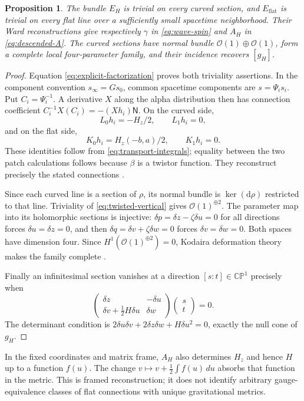 \documentclass[11pt]{article}
\numberwithin{equation}{section}
\newtheorem{proposition}[theorem]{Proposition}
\theoremstyle{definition}
\theoremstyle{remark}
\newcommand{\CP}{\mathbb{CP}}
\newcommand{\OO}{\mathcal O}
\newcommand{\dd}{\mathrm d}
\newcommand{\NN}{\mathsf N}
\begin{document}
\begin{proposition}\label{prop:reconstruction}
The bundle $E_H$ is trivial on every curved section, and $E_{\mathrm{flat}}$ is trivial on every flat line over a sufficiently small spacetime neighborhood. Their Ward reconstructions give respectively $\gamma$ in \eqref{eq:wave-spin} and $A_H$ in \eqref{eq:descended-A}. The curved sections have normal bundle $\OO(1)\oplus\OO(1)$, form a complete local four-parameter family, and their incidence recovers $[g_H]$.
\end{proposition}
\begin{proof}
Equation \eqref{eq:explicit-factorization} proves both triviality assertions. In the component convention $s_\infty=Gs_0$, common spacetime components are $s=\Psi_i s_i$. Put $C_i=\Psi_i^{-1}$. A derivative $X$ along the alpha distribution then has connection coefficient $C_i^{-1}X(C_i)=-(Xh_i)\NN$. On the curved side,
\[
L_0h_i=-H_z/2,\qquad L_1h_i=0,
\]
and on the flat side,
\[
K_0h_i=H_z(-b,a)/2,\qquad K_1h_i=0.
\]
These identities follow from \eqref{eq:transport-integrals}; equality between the two patch calculations follows because $\beta$ is a twistor function. They reconstruct precisely the stated connections \cite{Ward}.

Since each curved line is a section of $\rho$, its normal bundle is $\ker(\dd\rho)$ restricted to that line. Triviality of \eqref{eq:twisted-vertical} gives $\OO(1)^{\oplus2}$. The parameter map into its holomorphic sections is injective: $\delta p=\delta z-\zeta\delta u=0$ for all directions forces $\delta u=\delta z=0$, and then $\delta q=\delta v+\zeta\delta w=0$ forces $\delta v=\delta w=0$. Both spaces have dimension four. Since $H^1(\OO(1)^{\oplus2})=0$, Kodaira deformation theory makes the family complete \cite{Kodaira}.

Finally an infinitesimal section vanishes at a direction $[s:t]\in\CP^1$ precisely when
\[
\begin{pmatrix}\delta z&-\delta u\\
\delta v+\frac12H\delta u&\delta w\end{pmatrix}
\begin{pmatrix}s\\t\end{pmatrix}=0.
\]
The determinant condition is $2\delta u\delta v+2\delta z\delta w+H\delta u^2=0$, exactly the null cone of $g_H$.
\end{proof}

In the fixed coordinates and matrix frame, $A_H$ also determines $H_z$ and hence $H$ up to a function $f(u)$. The change $v\mapsto v+\tfrac12\int f(u)\,du$ absorbs that function in the metric. This is framed reconstruction; it does not identify arbitrary gauge-equivalence classes of flat connections with unique gravitational metrics.
\end{document}
